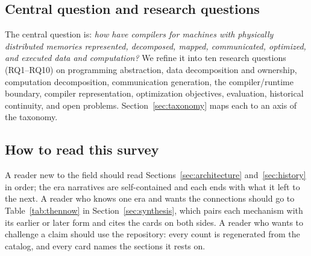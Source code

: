 \subsection{Central question and research questions}
The central question is: \emph{how have compilers for machines with physically distributed memories represented, decomposed, mapped, communicated, optimized, and executed data and computation?} We refine it into ten research questions (RQ1--RQ10) on programming abstraction, data decomposition and ownership, computation decomposition, communication generation, the compiler/runtime boundary, compiler representation, optimization objectives, evaluation, historical continuity, and open problems. Section~\ref{sec:taxonomy} maps each to an axis of the taxonomy.

\subsection{How to read this survey}
A reader new to the field should read Sections~\ref{sec:architecture} and~\ref{sec:history} in order; the era narratives are self-contained and each ends with what it left to the next. A reader who knows one era and wants the connections should go to Table~\ref{tab:thennow} in Section~\ref{sec:synthesis}, which pairs each mechanism with its earlier or later form and cites the cards on both sides. A reader who wants to challenge a claim should use the repository: every count is regenerated from the catalog, and every card names the sections it rests on.

